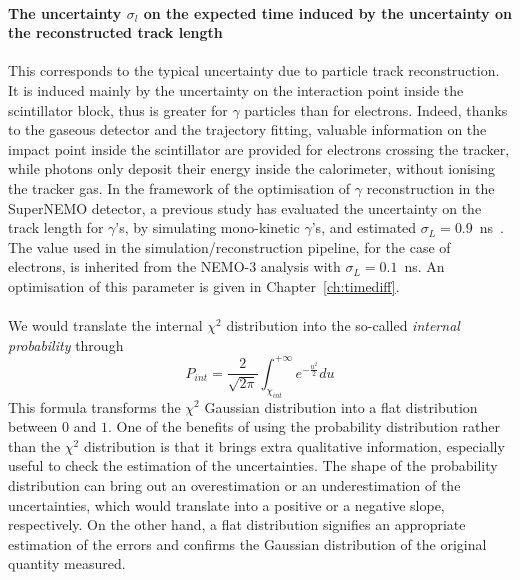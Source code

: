 \paragraph{The uncertainty $\sigma_{l}$ on the expected time induced by the uncertainty on the reconstructed track length}
This corresponds to the typical uncertainty due to particle track reconstruction.
It is induced mainly by the uncertainty on the interaction point inside the scintillator block, thus is greater for $\gamma$ particles than for electrons.
Indeed, thanks to the gaseous detector and the trajectory fitting, valuable information on the impact point inside the scintillator are provided for electrons crossing the tracker, while photons only deposit their energy inside the calorimeter, without ionising the tracker gas.
In the framework of the optimisation of $\gamma$ reconstruction in the SuperNEMO detector, a previous study has evaluated the uncertainty on the track length for $\gamma$'s, by simulating mono-kinetic $\gamma$'s, and estimated $\sigma_{L}=0.9$~ns~\cite{CalvezThesis}.
The value used in the simulation/reconstruction pipeline, for the case of electrons, is inherited from the NEMO-$3$ analysis with $\sigma_{L}=0.1$~ns.
An optimisation of this parameter is given in Chapter~\ref{ch:timediff}.

\paragraph{}

We would translate the internal $\chi^{2}$ distribution into the so-called \emph{internal probability} through
\begin{equation}
  P_{int} = \frac{2}{\sqrt{2\pi}}\int_{\chi_{int}}^{+ \infty} e^{-\frac{u^{2}}{2}} du %
  \label{eq:chi2_Pint}
\end{equation}
This formula transforms the $\chi^{2}$ Gaussian distribution into a flat distribution between $0$ and $1$.
One of the benefits of using the probability distribution rather than the $\chi^{2}$ distribution is that it brings extra qualitative information, especially useful to check the estimation of the uncertainties.
The shape of the probability distribution can bring out an overestimation or an underestimation of the uncertainties, which would translate into a positive or a negative slope, respectively.
On the other hand, a flat distribution signifies an appropriate estimation of the errors and confirms the Gaussian distribution of the original quantity measured.

